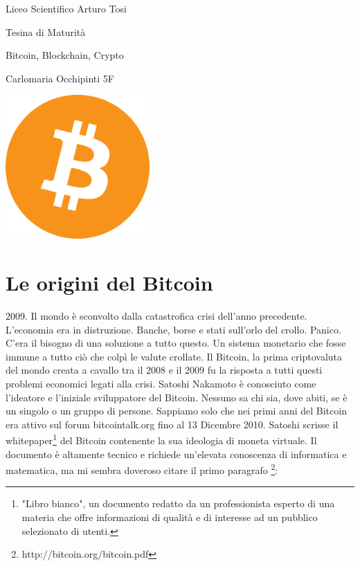\documentclass {article}
\begin{document}
\begin{titlepage}

\centering
{\LARGE Liceo Scientifico Arturo Tosi \par}
\vspace{1cm}
{\Large Tesina di Maturità\par}
\vspace{1.5cm}
{\huge Bitcoin, Blockchain, Crypto\par}
\vspace{2cm}
{\Large Carlomaria Occhipinti 5F\par}
\vfill
\includegraphics [width = 5.5cm] {logo.png}
\vfill

\end{titlepage}


\newpage

\tableofcontents
{}

\newpage


\section {Le origini del Bitcoin}


2009. Il mondo è sconvolto dalla catastrofica crisi dell'anno precedente.
L'economia era in distruzione. Banche, borse e stati sull'orlo del crollo. Panico.
C'era il bisogno di una soluzione a tutto questo. Un sistema monetario che fosse immune a tutto ciò che colpì le valute crollate. Il Bitcoin, la prima criptovaluta del mondo creata a cavallo tra il 2008 e il 2009 fu la risposta a tutti questi problemi economici legati alla crisi.
Satoshi Nakamoto è conosciuto come l'ideatore e l'iniziale sviluppatore del Bitcoin. Nessuno sa chi sia, dove abiti, se è un singolo o un gruppo di persone. Sappiamo solo che nei primi anni del Bitcoin era attivo sul forum bitcointalk.org fino al 13 Dicembre 2010.
Satoshi scrisse il whitepaper\footnote{"Libro bianco", un documento redatto da un professionista esperto di una materia che offre informazioni di qualità e di interesse ad un pubblico selezionato di utenti.} del Bitcoin contenente la sua ideologia di moneta virtuale. Il documento è altamente tecnico e richiede un'elevata conoscenza di informatica e matematica, ma mi sembra doveroso citare il primo paragrafo \footnote{http://bitcoin.org/bitcoin.pdf}:\\
\end{document}

